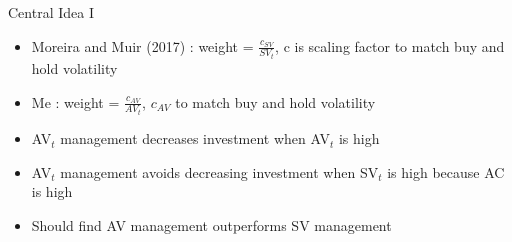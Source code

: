 \documentclass{beamer}
\begin{document}
\begin{frame}{Central Idea I}
	\begin{itemize}[<+->]
		\item Moreira and Muir (2017) : weight = $\frac{c_{SV}}{SV_{t}}$, c is scaling factor to match buy and hold volatility
		\item Me : weight = $\frac{c_{AV}}{AV_{t}}$, $c_{AV}$ to match buy and hold volatility
		\item AV$_{t}$ management decreases investment when AV$_{t}$ is high 
		\item AV$_{t}$ management avoids decreasing investment when SV$_{t}$ is high because AC is high
		\item Should find AV management outperforms SV management
	\end{itemize}
\end{frame}
\end{document}
